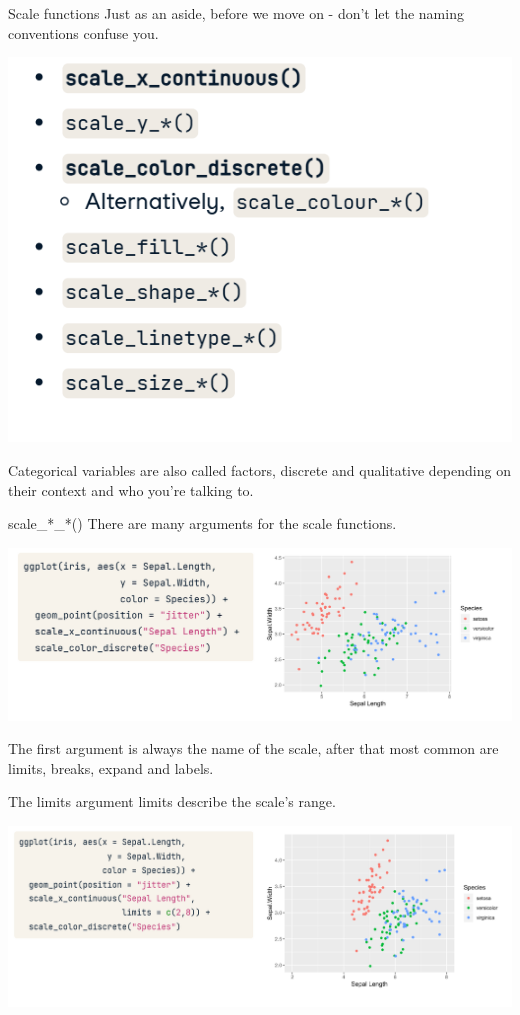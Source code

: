 \documentclass[
  ignorenonframetext,
]{beamer}
\begin{document}
\begin{frame}{Scale functions}
\label{scale-functions-4}
Just as an aside, before we move on - don't let the naming conventions
confuse you.

\includegraphics{../images/im159.png}

Categorical variables are also called factors, discrete and qualitative
depending on their context and who you're talking to.
\end{frame}

\begin{frame}{scale\_*\_*()}
\label{scale__}
There are many arguments for the scale functions.

\includegraphics{../images/im160.png}

The first argument is always the name of the scale, after that most
common are limits, breaks, expand and labels.
\end{frame}

\begin{frame}{The limits argument}
\label{the-limits-argument}
limits describe the scale's range.

\includegraphics{../images/im161.png}
\end{frame}
\end{document}
